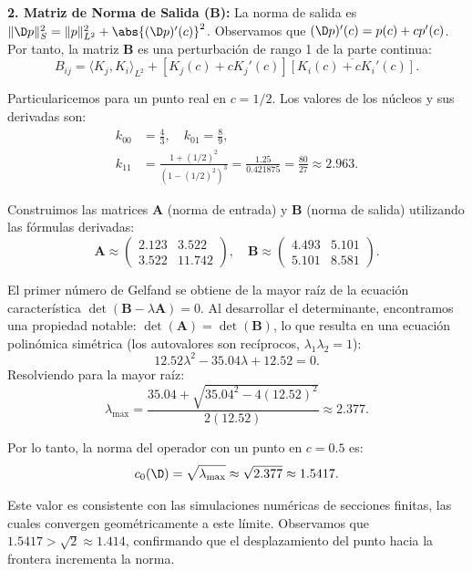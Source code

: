 \textbf{2. Matriz de Norma de Salida ($\mathbf{B}$):}
La norma de salida es $\|\D p\|_S^2 = \|p\|_{L^2}^2 + \abs{(\D p)'(c)}^2$. Observamos que $(\D p)'(c) = p(c) + c p'(c)$. Por tanto, la matriz $\mathbf{B}$ es una perturbación de rango 1 de la parte continua:
\[ B_{ij} = \langle K_j, K_i \rangle_{L^2} + [K_j(c) + c K_j'(c)] \overline{[K_i(c) + c K_i'(c)]}. \]

\begin{exm}[Ejemplo numérico: punto en $c = 0.5$]
	Particularicemos para un punto real en $c=1/2$. Los valores de los núcleos y sus derivadas son:
	\begin{align*}
		k_{00} & = \frac{4}{3}, \quad k_{01} = \frac{8}{9},                                               \\
		k_{11} & = \frac{1+(1/2)^2}{(1-(1/2)^2)^3} = \frac{1.25}{0.421875} = \frac{80}{27} \approx 2.963.
	\end{align*}

	Construimos las matrices $\mathbf{A}$ (norma de entrada) y $\mathbf{B}$ (norma de salida) utilizando las fórmulas derivadas:
	\begin{equation}
		\mathbf{A} \approx \begin{pmatrix} 2.123 & 3.522 \\ 3.522 & 11.742 \end{pmatrix}, \quad
		\mathbf{B} \approx \begin{pmatrix} 4.493 & 5.101 \\ 5.101 & 8.581 \end{pmatrix}.
	\end{equation}

	El primer número de Gelfand se obtiene de la mayor raíz de la ecuación característica $\det(\mathbf{B} - \lambda \mathbf{A}) = 0$. Al desarrollar el determinante, encontramos una propiedad notable: $\det(\mathbf{A}) = \det(\mathbf{B})$, lo que resulta en una ecuación polinómica simétrica (los autovalores son recíprocos, $\lambda_1 \lambda_2 = 1$):
	\begin{equation}
		12.52 \lambda^2 - 35.04 \lambda + 12.52 = 0.
	\end{equation}
	Resolviendo para la mayor raíz:
	\[ \lambda_{\max} = \frac{35.04 + \sqrt{35.04^2 - 4(12.52)^2}}{2(12.52)} \approx 2.377. \]

	Por lo tanto, la norma del operador con un punto en $c=0.5$ es:
	\begin{equation}
		c_0(\D) = \sqrt{\lambda_{\max}} \approx \sqrt{2.377} \approx 1.5417.
	\end{equation}

	Este valor es consistente con las simulaciones numéricas de secciones finitas, las cuales convergen geométricamente a este límite. Observamos que $1.5417 > \sqrt{2} \approx 1.414$, confirmando que el desplazamiento del punto hacia la frontera incrementa la norma.
\end{exm}

